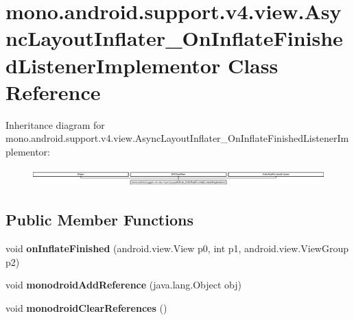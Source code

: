 \hypertarget{classmono_1_1android_1_1support_1_1v4_1_1view_1_1_async_layout_inflater___on_inflate_finished_listener_implementor}{}\section{mono.\+android.\+support.\+v4.\+view.\+Async\+Layout\+Inflater\+\_\+\+On\+Inflate\+Finished\+Listener\+Implementor Class Reference}
\label{classmono_1_1android_1_1support_1_1v4_1_1view_1_1_async_layout_inflater___on_inflate_finished_listener_implementor}
Inheritance diagram for mono.\+android.\+support.\+v4.\+view.\+Async\+Layout\+Inflater\+\_\+\+On\+Inflate\+Finished\+Listener\+Implementor\+:\begin{figure}[H]
\begin{center}
\leavevmode
\includegraphics[height=0.709759cm]{classmono_1_1android_1_1support_1_1v4_1_1view_1_1_async_layout_inflater___on_inflate_finished_listener_implementor}
\end{center}
\end{figure}
\subsection*{Public Member Functions}
\begin{DoxyCompactItemize}
\item 
\mbox{\label{classmono_1_1android_1_1support_1_1v4_1_1view_1_1_async_layout_inflater___on_inflate_finished_listener_implementor_af31cce908f0470666984ff2a3091b2df}} 
void {\bfseries on\+Inflate\+Finished} (android.\+view.\+View p0, int p1, android.\+view.\+View\+Group p2)
\item 
\mbox{\label{classmono_1_1android_1_1support_1_1v4_1_1view_1_1_async_layout_inflater___on_inflate_finished_listener_implementor_aeb414ca960fa961eda8878902552d73a}} 
void {\bfseries monodroid\+Add\+Reference} (java.\+lang.\+Object obj)
\item 
\mbox{\label{classmono_1_1android_1_1support_1_1v4_1_1view_1_1_async_layout_inflater___on_inflate_finished_listener_implementor_a42cf4d28baf440ec1cc7f6c331c9c464}} 
void {\bfseries monodroid\+Clear\+References} ()
\end{DoxyCompactItemize}
